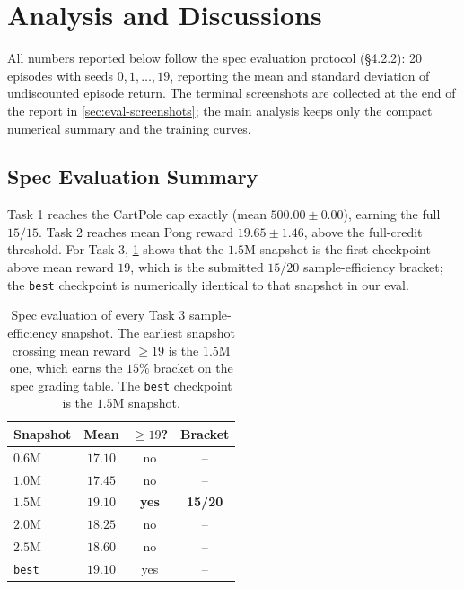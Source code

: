 \documentclass[10pt,twocolumn,letterpaper]{article}
\begin{document}
\section{Analysis and Discussions} \label{sec:analysis}

All numbers reported below follow the spec evaluation protocol (\S 4.2.2): 20 episodes with seeds $0,1,\ldots,19$, reporting the mean and standard deviation of undiscounted episode return. The terminal screenshots are collected at the end of the report in \cref{sec:eval-screenshots}; the main analysis keeps only the compact numerical summary and the training curves.

\subsection{Spec Evaluation Summary}

Task 1 reaches the CartPole cap exactly (mean $500.00 \pm 0.00$), earning the full $15/15$. Task 2 reaches mean Pong reward $19.65 \pm 1.46$, above the full-credit threshold. For Task 3, \cref{tab:task3_snapshots} shows that the $1.5$M snapshot is the first checkpoint above mean reward $19$, which is the submitted $15/20$ sample-efficiency bracket; the \texttt{best} checkpoint is numerically identical to that snapshot in our eval.

\begin{table}[h]
    \centering
    \footnotesize
    \setlength{\tabcolsep}{4pt}
    \begin{tabular}{@{}lccc@{}}
        \toprule
        \textbf{Snapshot} & \textbf{Mean} & \textbf{$\geq 19$?} & \textbf{Bracket} \\ \midrule
        $0.6$M           & $17.10$       & no                  & --                  \\
        $1.0$M           & $17.45$       & no                  & --                  \\
        $1.5$M           & $\mathbf{19.10}$ & \textbf{yes}     & \textbf{15/20}      \\
        $2.0$M           & $18.25$       & no                  & --                  \\
        $2.5$M           & $18.60$       & no                  & --                  \\
        \texttt{best}     & $19.10$       & yes                 & --                  \\
        \bottomrule
    \end{tabular}
    \caption{Spec evaluation of every Task 3 sample-efficiency snapshot. The earliest snapshot crossing mean reward $\geq 19$ is the $1.5$M one, which earns the $15\%$ bracket on the spec grading table. The \texttt{best} checkpoint is the $1.5$M snapshot.}
    \label{tab:task3_snapshots}
\end{table}
\end{document}
